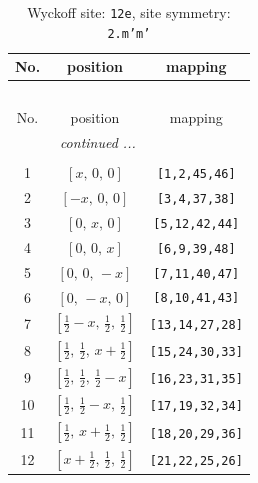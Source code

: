 \documentclass[fleqn,8pt]{jsarticle}
\begin{document}
\begin{longtable}{ccc}
\caption{Wyckoff site: {\tt 12e}, site symmetry: {\tt 2.m'm'}}
 \\
 \hline \hline
No. & position & mapping \\ \hline \endfirsthead

\multicolumn{2}{l}{\tablename\ \thetable{}} \\
 \hline \hline
No. & position & mapping \\ \hline \endhead

 \hline \hline
\multicolumn{2}{r}{\footnotesize\it continued ...} \\ \endfoot

 \hline \hline
\multicolumn{2}{r}{} \\ \endlastfoot

1 & $\left[ x,\, 0,\, 0 \right]$ & {\tt [1,2,45,46]} \\ \hline
2 & $\left[ - x,\, 0,\, 0 \right]$ & {\tt [3,4,37,38]} \\ \hline
3 & $\left[ 0,\, x,\, 0 \right]$ & {\tt [5,12,42,44]} \\ \hline
4 & $\left[ 0,\, 0,\, x \right]$ & {\tt [6,9,39,48]} \\ \hline
5 & $\left[ 0,\, 0,\, - x \right]$ & {\tt [7,11,40,47]} \\ \hline
6 & $\left[ 0,\, - x,\, 0 \right]$ & {\tt [8,10,41,43]} \\ \hline
7 & $\left[ \frac{1}{2} - x,\, \frac{1}{2},\, \frac{1}{2} \right]$ & {\tt [13,14,27,28]} \\ \hline
8 & $\left[ \frac{1}{2},\, \frac{1}{2},\, x + \frac{1}{2} \right]$ & {\tt [15,24,30,33]} \\ \hline
9 & $\left[ \frac{1}{2},\, \frac{1}{2},\, \frac{1}{2} - x \right]$ & {\tt [16,23,31,35]} \\ \hline
10 & $\left[ \frac{1}{2},\, \frac{1}{2} - x,\, \frac{1}{2} \right]$ & {\tt [17,19,32,34]} \\ \hline
11 & $\left[ \frac{1}{2},\, x + \frac{1}{2},\, \frac{1}{2} \right]$ & {\tt [18,20,29,36]} \\ \hline
12 & $\left[ x + \frac{1}{2},\, \frac{1}{2},\, \frac{1}{2} \right]$ & {\tt [21,22,25,26]} \\
\end{longtable}
\renewcommand{\arraystretch}{1.2}
\end{document}
